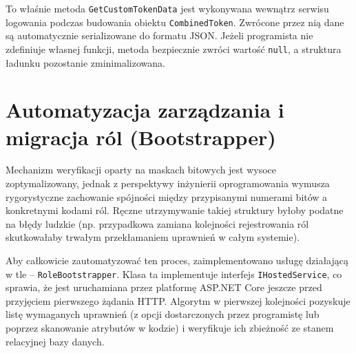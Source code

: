 \documentclass{SGGW-thesis}
\begin{document}
\vspace{2cm}

To właśnie metoda \texttt{GetCustomTokenData} jest wykonywana wewnątrz serwisu logowania podczas budowania obiektu \texttt{CombinedToken}. Zwrócone przez nią dane są automatycznie serializowane do formatu JSON. Jeżeli programista nie zdefiniuje własnej funkcji, metoda bezpiecznie zwróci wartość \texttt{null}, a struktura ładunku pozostanie zminimalizowana.

\clearpage

\section{Automatyzacja zarządzania i migracja ról (Bootstrapper)}

Mechanizm weryfikacji oparty na maskach bitowych jest wysoce zoptymalizowany, jednak z perspektywy inżynierii oprogramowania wymusza rygorystyczne zachowanie spójności między przypisanymi numerami bitów a konkretnymi kodami ról. Ręczne utrzymywanie takiej struktury byłoby podatne na błędy ludzkie (np. przypadkowa zamiana kolejności rejestrowania ról skutkowałaby trwałym przekłamaniem uprawnień w całym systemie). 

Aby całkowicie zautomatyzować ten proces, zaimplementowano usługę działającą w tle – \texttt{RoleBootstrapper}. Klasa ta implementuje interfejs \texttt{IHostedService}, co sprawia, że jest uruchamiana przez platformę ASP.NET Core jeszcze przed przyjęciem pierwszego żądania HTTP. Algorytm w pierwszej kolejności pozyskuje listę wymaganych uprawnień (z opcji dostarczonych przez programistę lub poprzez skanowanie atrybutów w kodzie) i weryfikuje ich zbieżność ze stanem relacyjnej bazy danych.

\clearpage
\end{document}
